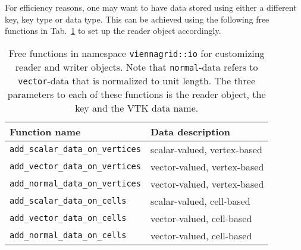 For efficiency reasons, one may want to have data stored using either a different key, key type or data type.
 This can be achieved using the following free functions in Tab.~\ref{tab:customizing-io} to set up the reader object accordingly.

 \begin{table}[tb]
 \begin{center}
  \begin{tabular}{|l|l|}
   \hline
   Function name & Data description \\
   \hline
   \lstinline|add_scalar_data_on_vertices| & scalar-valued, vertex-based \\
   \lstinline|add_vector_data_on_vertices| & vector-valued, vertex-based \\
   \lstinline|add_normal_data_on_vertices| & vector-valued, vertex-based \\
   \hline
   \lstinline|add_scalar_data_on_cells| & scalar-valued, cell-based \\
   \lstinline|add_vector_data_on_cells| & vector-valued, cell-based \\
   \lstinline|add_normal_data_on_cells| & vector-valued, cell-based \\
   \hline
  \end{tabular}
 \end{center}
 \caption{Free functions in namespace \lstinline|viennagrid::io| for customizing reader and writer objects. Note that \lstinline|normal|-data refers to \lstinline|vector|-data that is normalized to unit length. The three parameters to each of these functions is the reader object, the {\ViennaData} key and the VTK data name.}
 \label{tab:customizing-io}
 \end{table}
 



